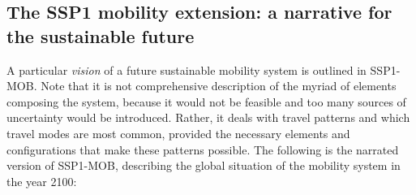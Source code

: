 \subsection[The SSP1 mobility extension]{The SSP1 mobility extension: a narrative for the sustainable future}
\label{ss:results:ssp1-mob-development}
A particular \emph{vision} of a future sustainable mobility system is outlined in SSP1-MOB. Note that it is not comprehensive description of the myriad of elements composing the system, because it would not be feasible and too many sources of uncertainty would be introduced. Rather, it deals with travel patterns and which travel modes are most common, provided the necessary elements and configurations that make these patterns possible. The following is the narrated version of SSP1-MOB, describing the global situation of the mobility system in the year 2100:
%
